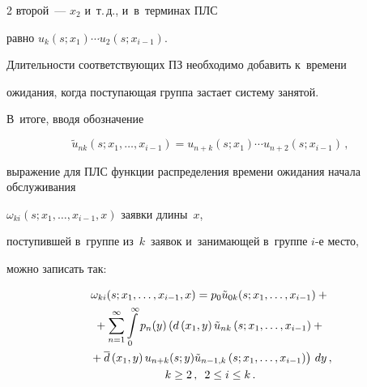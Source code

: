 \begin{multicols}{2}
второй~--- $x_2$ и~т.\,д., и~в~терми\-нах ПЛС


равно $u_{k}(s;x_1)\cdots u_{2}(s;x_{i-1})$.


Длительности соответствующих ПЗ необходимо добавить к~времени


ожидания, когда по\-сту\-па\-ющая группа застает сис\-те\-му занятой.


В~итоге, вводя обозначение 





\noindent


$$


{\tilde u}_{nk}(s;x_1,\dots,x_{i-1})


=u_{n+k}(s;x_1)\cdots u_{n+2}(s;x_{i-1})\,,


$$


выражение для ПЛС функции распределения времени ожидания начала обслуживания


$\omega_{ki}(s;x_1, \dots, x_{i-1},x)$ заявки длины~$x$,


поступившей в~группе из~$k$~заявок и~занимающей в~группе $i$-е место,


можно записать так:





\noindent


\begin{multline*}


\omega_{ki}(s;x_1, \dots, x_{i-1},x) =


p_0 {\tilde u}_{0k}(s;x_1,\dots,x_{i-1})


+{}


\\


{}+


\sum\limits_{n=1}^\infty \int\limits_0^\infty p_n(y) \left (


d\left(x_1,y\right) {\tilde u}_{nk}\left(s;x_1,\dots,x_{i-1}\right)


+ {}\right.\\


\left.{}+\d\left(x_1,y\right) u_{n+k}(s;y)


{\tilde u}_{n-1,k}\left(s;x_1,\dots,x_{i-1}\right)


\right )\,dy\,,


\\


 k \ge 2\,, \enskip 2 \le i \le k\,.


\end{multline*}






\end{multicols}

